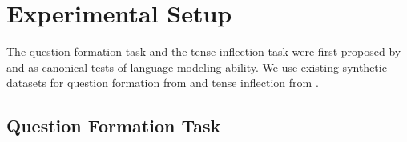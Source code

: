 
\section{Experimental Setup}
\label{sec:experiments}
The question formation task and the tense inflection task were first proposed by \citet{Frank2007-pn} and \citet{Linzen2016-vx} as canonical tests of language modeling ability. We use existing synthetic datasets for question formation from \citet{McCoy2018-uv} and tense inflection from \citet{McCoy2020-pj}.
\subsection{Question Formation Task}
\label{sec:qf_task}
\begin{table}[t]
    \centering
    {\renewcommand{\arraystretch}{1.12}
    \small
      \caption{\textbf{Examples from two grammar case studies.} \textit{Top}: In the question formation task, the model moves the main auxiliary verb to the front to form a question.
      \textit{Bottom}:  In the tense inflection task, the model inflects the main verb from past to present tense, while respecting subject-verb agreement. }  
    \label{tab:task_examples}
    }
\end{table}
